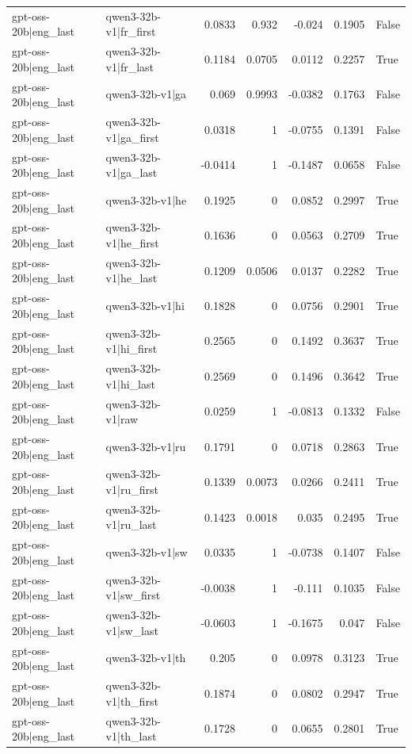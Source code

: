 \begin{table}
\begin{tabular}{l l r r r r l}
gpt-oss-20b|eng_last & qwen3-32b-v1|fr_first & 0.0833 & 0.932 & -0.024 & 0.1905 & False \\
gpt-oss-20b|eng_last & qwen3-32b-v1|fr_last & 0.1184 & 0.0705 & 0.0112 & 0.2257 & True \\
gpt-oss-20b|eng_last & qwen3-32b-v1|ga & 0.069 & 0.9993 & -0.0382 & 0.1763 & False \\
gpt-oss-20b|eng_last & qwen3-32b-v1|ga_first & 0.0318 & 1 & -0.0755 & 0.1391 & False \\
gpt-oss-20b|eng_last & qwen3-32b-v1|ga_last & -0.0414 & 1 & -0.1487 & 0.0658 & False \\
gpt-oss-20b|eng_last & qwen3-32b-v1|he & 0.1925 & 0 & 0.0852 & 0.2997 & True \\
gpt-oss-20b|eng_last & qwen3-32b-v1|he_first & 0.1636 & 0 & 0.0563 & 0.2709 & True \\
gpt-oss-20b|eng_last & qwen3-32b-v1|he_last & 0.1209 & 0.0506 & 0.0137 & 0.2282 & True \\
gpt-oss-20b|eng_last & qwen3-32b-v1|hi & 0.1828 & 0 & 0.0756 & 0.2901 & True \\
gpt-oss-20b|eng_last & qwen3-32b-v1|hi_first & 0.2565 & 0 & 0.1492 & 0.3637 & True \\
gpt-oss-20b|eng_last & qwen3-32b-v1|hi_last & 0.2569 & 0 & 0.1496 & 0.3642 & True \\
gpt-oss-20b|eng_last & qwen3-32b-v1|raw & 0.0259 & 1 & -0.0813 & 0.1332 & False \\
gpt-oss-20b|eng_last & qwen3-32b-v1|ru & 0.1791 & 0 & 0.0718 & 0.2863 & True \\
gpt-oss-20b|eng_last & qwen3-32b-v1|ru_first & 0.1339 & 0.0073 & 0.0266 & 0.2411 & True \\
gpt-oss-20b|eng_last & qwen3-32b-v1|ru_last & 0.1423 & 0.0018 & 0.035 & 0.2495 & True \\
gpt-oss-20b|eng_last & qwen3-32b-v1|sw & 0.0335 & 1 & -0.0738 & 0.1407 & False \\
gpt-oss-20b|eng_last & qwen3-32b-v1|sw_first & -0.0038 & 1 & -0.111 & 0.1035 & False \\
gpt-oss-20b|eng_last & qwen3-32b-v1|sw_last & -0.0603 & 1 & -0.1675 & 0.047 & False \\
gpt-oss-20b|eng_last & qwen3-32b-v1|th & 0.205 & 0 & 0.0978 & 0.3123 & True \\
gpt-oss-20b|eng_last & qwen3-32b-v1|th_first & 0.1874 & 0 & 0.0802 & 0.2947 & True \\
gpt-oss-20b|eng_last & qwen3-32b-v1|th_last & 0.1728 & 0 & 0.0655 & 0.2801 & True \\

\end{tabular}
\end{table}
